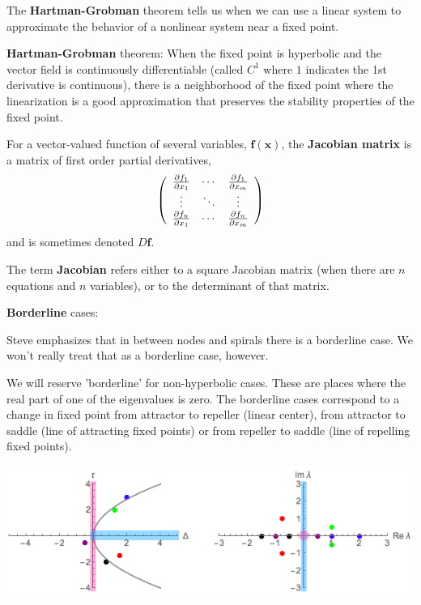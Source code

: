 \documentclass[12pt,letterpaper,noanswers]{exam}
\begin{document}
\begin{tcolorbox}
The \textbf{Hartman-Grobman} theorem tells us when we can use a linear system to approximate the behavior of a nonlinear system near a fixed point.  

\textbf{Hartman-Grobman} theorem: When the fixed point is hyperbolic and the vector field is continuously differentiable (called $C^1$ where $1$ indicates the 1st derivative is continuous), there is a neighborhood of the fixed point where the linearization is a good approximation that preserves the stability properties of the fixed point.

For a vector-valued function of several variables, $\mathbf{f}(\mathbf{x})$, the \textbf{Jacobian matrix} is a matrix of first order partial derivatives,
\[\left(\begin{array}{c c c} \frac{\partial f_1}{\partial x_1} & \cdots & \frac{\partial f_1}{\partial x_m} \\ \vdots & \ddots & \vdots \\
\frac{\partial f_n}{\partial x_1} & \cdots & \frac{\partial f_n}{\partial x_m}
\end{array}\right)\]
and is sometimes denoted $D\mathbf{f}$.

The term \textbf{Jacobian} refers either to a square Jacobian matrix (when there are $n$ equations and $n$ variables), or to the determinant of that matrix.

\end{tcolorbox}

\textbf{Borderline} cases:

Steve emphasizes that in between nodes and spirals there is a borderline case.  We won't really treat that as a borderline case, however.  

We will reserve 'borderline' for non-hyperbolic cases.  These are places where the real part of one of the eigenvalues is zero.  The borderline cases correspond to a change in fixed point from attractor to repeller (linear center), from attractor to saddle (line of attracting fixed points) or from repeller to saddle (line of repelling fixed points).

\includegraphics[width=\linewidth]{img/S19Week07p2.png}
\end{document}
